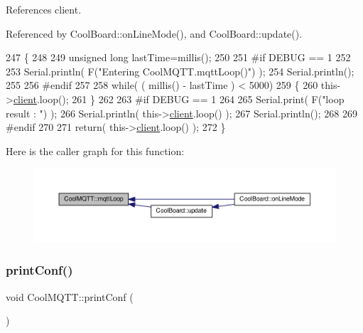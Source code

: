 References client.



Referenced by Cool\+Board\+::on\+Line\+Mode(), and Cool\+Board\+::update().


\begin{DoxyCode}
247 \{
248 
249     \textcolor{keywordtype}{unsigned} \textcolor{keywordtype}{long} lastTime=millis();
250 
251 \textcolor{preprocessor}{#if DEBUG == 1}
252 
253     Serial.println( F(\textcolor{stringliteral}{"Entering CoolMQTT.mqttLoop()"}) );
254     Serial.println();
255 
256 \textcolor{preprocessor}{#endif  }
257 
258     \textcolor{keywordflow}{while}( ( millis() - lastTime ) < 5000)
259     \{
260         this->\hyperlink{classCoolMQTT_a4ca71e4f76ef868692a297efd45b1415}{client}.loop();  
261     \}
262 
263 \textcolor{preprocessor}{#if DEBUG == 1 }
264     
265     Serial.print( F(\textcolor{stringliteral}{"loop result : "}) );
266     Serial.println( this->\hyperlink{classCoolMQTT_a4ca71e4f76ef868692a297efd45b1415}{client}.loop() );
267     Serial.println();
268 
269 \textcolor{preprocessor}{#endif}
270 
271     \textcolor{keywordflow}{return}( this->\hyperlink{classCoolMQTT_a4ca71e4f76ef868692a297efd45b1415}{client}.loop() );
272 \}
\end{DoxyCode}
Here is the caller graph for this function\+:\nopagebreak
\begin{figure}[H]
\begin{center}
\leavevmode
\includegraphics[width=350pt]{classCoolMQTT_aa5eaae967b562b62cbcf2b8d81f6e5d5_icgraph}
\end{center}
\end{figure}
\mbox{\label{classCoolMQTT_a40553a0ad4b5ecf1cb4411ab54ca85fb}} 
\subsubsection{\texorpdfstring{print\+Conf()}{printConf()}}
{\footnotesize\ttfamily void Cool\+M\+Q\+T\+T\+::print\+Conf (\begin{DoxyParamCaption}{ }\end{DoxyParamCaption})}

